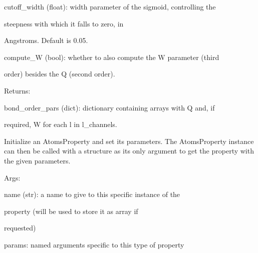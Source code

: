 \documentclass[letterpaper,10pt,english]{sphinxmanual}
\begin{document}
\begin{fulllineitems}
\begin{DUlineblock}{0em}
\begin{DUlineblock}{\DUlineblockindent}
\begin{DUlineblock}{\DUlineblockindent}
\end{DUlineblock}
\item[] cutoff\_width (float): width parameter of the sigmoid, controlling the
\item[]
\begin{DUlineblock}{\DUlineblockindent}
\item[] steepness with which it falls to zero, in 
\item[] Angstroms. Default is 0.05.
\end{DUlineblock}
\item[] compute\_W (bool): whether to also compute the W parameter (third
\item[]
\begin{DUlineblock}{\DUlineblockindent}
\item[] order) besides the Q (second order).
\end{DUlineblock}
\end{DUlineblock}
\end{DUlineblock}

\begin{DUlineblock}{0em}
\item[] Returns:
\item[]
\begin{DUlineblock}{\DUlineblockindent}
\item[] bond\_order\_pars (dict): dictionary containing arrays with Q and, if
\item[]
\begin{DUlineblock}{\DUlineblockindent}
\item[] required, W for each l in l\_channels.
\end{DUlineblock}
\end{DUlineblock}
\end{DUlineblock}

Initialize an AtomsProperty and set its parameters.
The AtomsProperty instance can then be called with a structure as its
only argument to get the property with the given parameters.

\begin{DUlineblock}{0em}
\item[] Args:
\item[]
\begin{DUlineblock}{\DUlineblockindent}
\item[] name (str): a name to give to this specific instance of the
\item[]
\begin{DUlineblock}{\DUlineblockindent}
\item[] property (will be used to store it as array if
\item[] requested)
\end{DUlineblock}
\item[] params: named arguments specific to this type of property
\end{DUlineblock}
\end{DUlineblock}


\end{fulllineitems}
\end{document}
